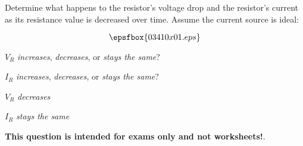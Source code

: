 

Determine what happens to the resistor's voltage drop and the resistor's current as its resistance value is decreased over time.  Assume the current source is ideal:

$$\epsfbox{03410x01.eps}$$

$V_R$ {\it increases}, {\it decreases}, or {\it stays the same}?

\vskip 10pt

$I_R$ {\it increases}, {\it decreases}, or {\it stays the same}?







$V_R$ {\it decreases}

\vskip 10pt

$I_R$ {\it stays the same}







{\bf This question is intended for exams only and not worksheets!}.



